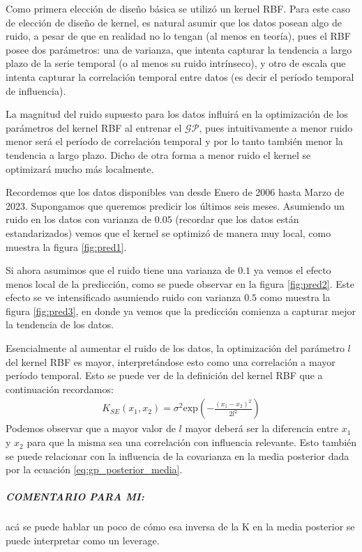 \documentclass[a4paper]{article}
\newcommand{\gp}{\ensuremath{\mathcal{GP}}}
\begin{document}
Como primera elección de diseño básica se utilizó un kernel RBF. Para este caso de elección de diseño de kernel, es natural asumir que los datos posean algo de ruido, a pesar de que en realidad no lo tengan (al menos en teoría), pues el RBF posee dos parámetros: una de varianza, que intenta capturar la tendencia a largo plazo de la serie temporal (o al menos su ruido intrínseco), y otro de escala que intenta capturar la correlación temporal entre datos (es decir el período temporal de influencia).

La magnitud del ruido supuesto para los datos influirá en la optimización de los parámetros del kernel RBF al entrenar el $\gp$, pues intuitivamente a menor ruido menor será el período de correlación temporal y por lo tanto también menor la tendencia a largo plazo. Dicho de otra forma a menor ruido el kernel se optimizará mucho más localmente.

Recordemos que los datos disponibles van desde Enero de 2006 hasta Marzo de 2023. Supongamos que queremos predicir los últimos seis meses. Asumiendo un ruido en los datos con varianza de $0.05$ (recordar que los datos están estandarizados) vemos que el kernel se optimizó de manera muy local, como muestra la figura \ref{fig:pred1}.

Si ahora asumimos que el ruido tiene una varianza de $0.1$ ya vemos el efecto menos local de la predicción, como se puede observar en la figura \ref{fig:pred2}. Este efecto se ve intensificado asumiendo ruido con varianza $0.5$ como muestra la figura \ref{fig:pred3}, en donde ya vemos que la predicción comienza a capturar mejor la tendencia de los datos.

Esencialmente al aumentar el ruido de los datos, la optimización del parámetro $l$ del kernel RBF es mayor, interpretándose esto como una correlación a mayor período temporal. Esto se puede ver de la definición del kernel RBF que a continuación recordamos:
\begin{align}
	K_{SE}(x_1,x_2) = \sigma^2 \text{exp}\left(-\frac{(x_1-x_2)^2}{2l^2}\right) %
\end{align} 
Podemos observar que a mayor valor de $l$ mayor deberá ser la diferencia entre $x_1$ y $x_2$ para que la misma sea una correlación con influencia relevante. Esto también se puede relacionar con la influencia de la covarianza en la media posterior dada por la ecuación \ref{eq:gp_posterior_media}.

\subparagraph{COMENTARIO PARA MI:} acá se puede hablar un poco de cómo esa inversa de la K en la media posterior se puede interpretar como un leverage.
\end{document}

